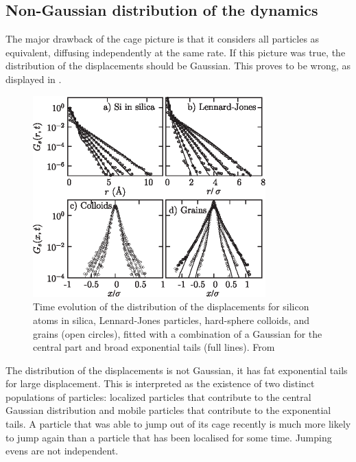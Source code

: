\subsection{Non-Gaussian distribution of the dynamics}
\label{sec:nongaussian}

The major drawback of the cage picture is that it considers all particles as equivalent, diffusing independently at the same rate. If this picture was true, the distribution of the displacements should be Gaussian. This proves to be wrong, as displayed in .

\begin{figure}
	\centering
	\includegraphics[width=0.8\textwidth]{not_gaussian}
	\caption{Time evolution of the distribution of the displacements for silicon atoms in silica, Lennard-Jones particles, hard-sphere colloids, and grains (open circles), fitted with a combination of a Gaussian for the central part and broad exponential tails (full lines). From~\citep{Chaudhuri2007}}
	\label{fig:not_gaussian}
\end{figure}

The distribution of the displacements is not Gaussian, it has fat exponential tails for large displacement. This is interpreted as the existence of two distinct populations of particles: localized particles that contribute to the central Gaussian distribution and mobile particles that contribute to the exponential tails. A particle that was able to jump out of its cage recently is much more likely to jump again than a particle that has been localised for some time. Jumping evens are not independent.


